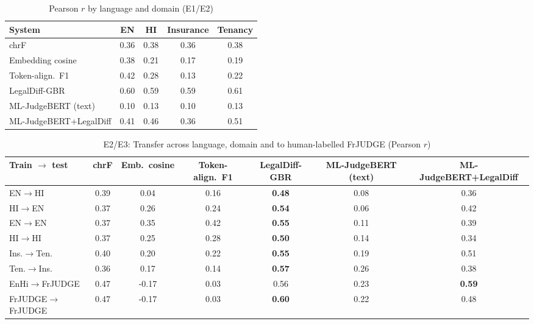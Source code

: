 \begin{table}[t]
\caption{Pearson $r$ by language and domain (E1/E2)}\label{tab:lang}
\centering\footnotesize
\begin{tabular}{@{}lcccc@{}}
\toprule
System & EN & HI & Insurance & Tenancy\\
\midrule
chrF & 0.36 & 0.38 & 0.36 & 0.38 \\
Embedding cosine & 0.38 & 0.21 & 0.17 & 0.19 \\
Token-align.\ F1 & 0.42 & 0.28 & 0.13 & 0.22 \\
\midrule
LegalDiff-GBR & 0.60 & 0.59 & 0.59 & 0.61 \\
ML-JudgeBERT (text) & 0.10 & 0.13 & 0.10 & 0.13 \\
ML-JudgeBERT+LegalDiff & 0.41 & 0.46 & 0.36 & 0.51 \\
\bottomrule
\end{tabular}
\end{table}

\begin{table}[t]
\caption{E2/E3: Transfer across language, domain and to human-labelled FrJUDGE (Pearson $r$)}\label{tab:transfer}
\centering\footnotesize
\begin{tabular}{@{}lcccccc@{}}
\toprule
Train $\rightarrow$ test & chrF & Emb.\ cosine & Token-align.\ F1 & LegalDiff-GBR & ML-JudgeBERT (text) & ML-JudgeBERT+LegalDiff\\
\midrule
EN$\rightarrow$HI & 0.39 & 0.04 & 0.16 & \textbf{0.48} & 0.08 & 0.36 \\
HI$\rightarrow$EN & 0.37 & 0.26 & 0.24 & \textbf{0.54} & 0.06 & 0.42 \\
EN$\rightarrow$EN & 0.37 & 0.35 & 0.42 & \textbf{0.55} & 0.11 & 0.39 \\
HI$\rightarrow$HI & 0.37 & 0.25 & 0.28 & \textbf{0.50} & 0.14 & 0.34 \\
\midrule
Ins.$\rightarrow$Ten. & 0.40 & 0.20 & 0.22 & \textbf{0.55} & 0.19 & 0.51 \\
Ten.$\rightarrow$Ins. & 0.36 & 0.17 & 0.14 & \textbf{0.57} & 0.26 & 0.38 \\
\midrule
EnHi$\rightarrow$FrJUDGE & 0.47 & -0.17 & 0.03 & 0.56 & 0.23 & \textbf{0.59} \\
FrJUDGE$\rightarrow$FrJUDGE & 0.47 & -0.17 & 0.03 & \textbf{0.60} & 0.22 & 0.48 \\
\bottomrule
\end{tabular}
\end{table}

